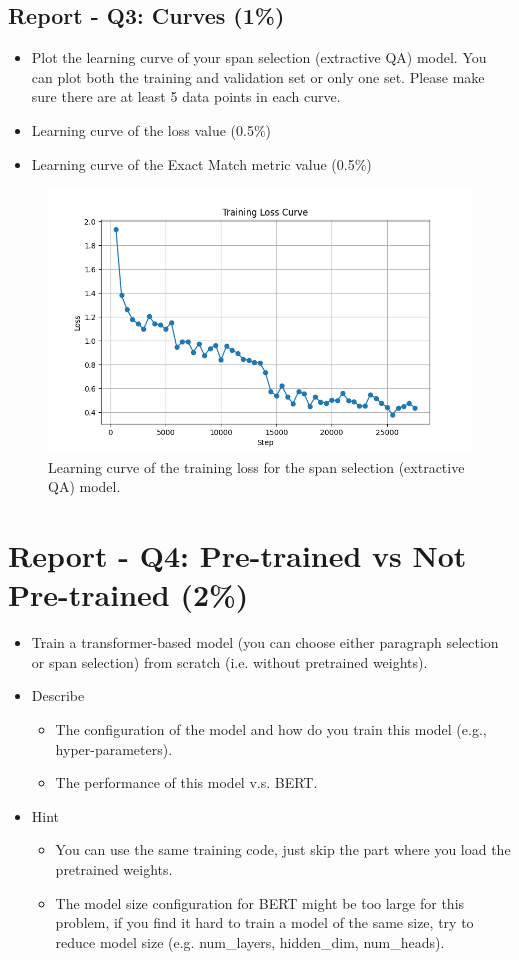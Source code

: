 \documentclass{article}
\begin{document}
\subsection{Report - Q3: Curves (1\%)}
\begin{itemize}
    \item Plot the learning curve of your span selection (extractive QA) model. You can plot both the training and validation set or only one set. Please make sure there are at least 5 data points in each curve.
    \item Learning curve of the loss value (0.5\%)
    \item Learning curve of the Exact Match metric value (0.5\%)
\end{itemize}

\begin{figure}[h]
    \centering
    \includegraphics[width=0.7\linewidth]{training_loss_curve.png}
    \caption{Learning curve of the training loss for the span selection (extractive QA) model.}
    \label{fig:training_loss_curve}
\end{figure}


\section{Report - Q4: Pre-trained vs Not Pre-trained (2\%)}
\begin{itemize}
    \item Train a transformer-based model (you can choose either paragraph selection or span selection) from scratch (i.e. without pretrained weights).
    \item Describe
          \begin{itemize}
              \item The configuration of the model and how do you train this model (e.g., hyper-parameters).
              \item The performance of this model v.s. BERT.
          \end{itemize}
    \item Hint
          \begin{itemize}
              \item You can use the same training code, just skip the part where you load the pretrained weights.
              \item The model size configuration for BERT might be too large for this problem, if you find it hard to train a model of the same size, try to reduce model size (e.g. num\_layers, hidden\_dim, num\_heads).
          \end{itemize}
\end{itemize}
\end{document}
